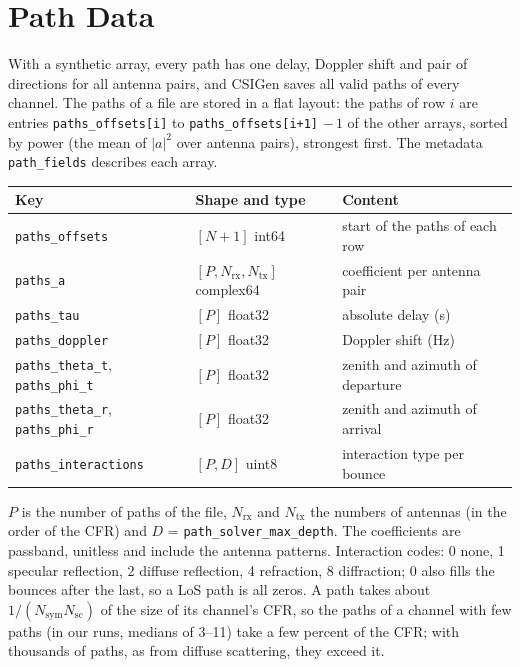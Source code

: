 \documentclass{article}
\newcommand{\key}[1]{\texttt{#1}}
\begin{document}
\clearpage
\section{Path Data}
\label{sec:paths}
With a synthetic array, every path has one delay, Doppler shift and pair of directions for all antenna pairs, and CSIGen saves all valid paths of every channel. The paths of a file are stored in a flat layout: the paths of row $i$ are entries \texttt{paths\_offsets[i]} to \texttt{paths\_offsets[i+1]} $-\,1$ of the other arrays, sorted by power (the mean of $|a|^2$ over antenna pairs), strongest first. The metadata \texttt{path\_fields} describes each array.

\begin{center}
\small
\begin{tabular}{@{}lll@{}}
\toprule
Key & Shape and type & Content \\
\midrule
\texttt{paths\_offsets} & $[N+1]$ int64 & start of the paths of each row \\
\texttt{paths\_a} & $[P, N_\mathrm{rx}, N_\mathrm{tx}]$ complex64 & coefficient per antenna pair \\
\texttt{paths\_tau} & $[P]$ float32 & absolute delay (s) \\
\texttt{paths\_doppler} & $[P]$ float32 & Doppler shift (Hz) \\
\texttt{paths\_theta\_t}, \texttt{paths\_phi\_t} & $[P]$ float32 & zenith and azimuth of departure \\
\texttt{paths\_theta\_r}, \texttt{paths\_phi\_r} & $[P]$ float32 & zenith and azimuth of arrival \\
\texttt{paths\_interactions} & $[P, D]$ uint8 & interaction type per bounce \\
\bottomrule
\end{tabular}
\end{center}
$P$ is the number of paths of the file, $N_\mathrm{rx}$ and $N_\mathrm{tx}$ the numbers of antennas (in the order of the CFR) and $D$ = \key{path\_solver\_max\_depth}. The coefficients are passband, unitless and include the antenna patterns. Interaction codes: 0 none, 1 specular reflection, 2 diffuse reflection, 4 refraction, 8 diffraction; 0 also fills the bounces after the last, so a LoS path is all zeros. A path takes about $1/(N_\mathrm{sym} N_\mathrm{sc})$ of the size of its channel's CFR, so the paths of a channel with few paths (in our runs, medians of 3--11) take a few percent of the CFR; with thousands of paths, as from diffuse scattering, they exceed it.
\end{document}
